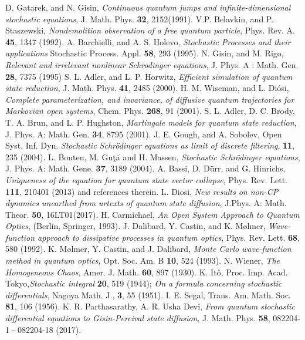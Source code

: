 \begin{thebibliography}{99}
	 D. Gatarek, and N. Gisin, {\em Continuous quantum jumps and infinite-dimensional stochastic equations}, J. Math. Phys. {\bf 32}, 2152(1991). 
	 V.P. Belavkin, and P. Staszewski, {\em Nondemolition observation of a free quantum particle}, Phys. Rev. A. {\bf 45}, 1347  (1992). 
	 A. Barchielli, and A. S. Holevo, {\em Stochastic Processes and their applications} Stochastic Process. Appl. {\bf 58}, 293 (1995).
	 N. Gisin, and M. Rigo, {\em Relevant and irrelevant nonlinear Schrodinger equations}, J. Phys. A : Math. Gen. {\bf 28}, 7375 (1995)
	 S. L. Adler, and L. P. Horwitz, {\em Efficient simulation of quantum state reduction}, J. Math. Phys. {\bf 41}, 2485 (2000).   
	 H. M. Wiseman, and  L. Di{\'o}si, {\em Complete parameterization, and invariance, of diffusive quantum trajectories for Markovian open systems}, Chem. Phys. {\bf 268}, 91 (2001). 
	 S. L. Adler, D. C. Brody, T. A. Brun, and L. P. Hughston, {\em Martingale models for quantum state reduction},  J. Phys. A: Math. Gen. {\bf 34}, 8795 (2001). 
	 J. E. Gough, and A. Sobolev, Open Syst. Inf. Dyn. {\em Stochastic Schrödinger equations as limit of discrete filtering}, {\bf 11}, 235 (2004).
	 L. Bouten, M. Gu{\c t}{\u a} and  H. Massen, {\em Stochastic Schrödinger equations}, J. Phys. A: Math. Gene. {\bf 37}, 3189 (2004). 
	 A. Bassi, D. D{\"u}rr, and  G. Hinrichs, {\em Uniqueness of the equation for quantum state vector collapse}, Phys. Rev. Lett. {\bf 111}, 210401 (2013) and references therein.  
	 L. Diosi, {\em New results on non-CP dynamics unearthed from urtexts of quantum state diffusion}, J.Phys. A: Math. Theor. {\bf 50}, 16LT01(2017). 
	 H. Carmichael, {\it An Open System Approach to Quantum Optics}, (Berlin, Springer, 1993). 
	 J. Dalibard, Y. Castin, and K. M{\o}lmer,  {\em Wave-function approach to dissipative processes in quantum optics}, Phys. Rev. Lett. {\bf 68}, 580 (1992). 
	 K. M{\o}lmer, Y. Castin, and J. Dalibard, {\em Monte Carlo wave-function method in quantum optics}, Opt. Soc. Am. B {\bf 10}, 524 (1993).   
	 N. Wiener, {\em The Homogeneous Chaos}, Amer. J. Math. {\bf 60}, 897 (1930).   
	 K. It\^{o}, Proc.  Imp. Acad. Tokyo,{\em Stochastic integral} {\bf 20}, 519 (1944); {\em On a formula concerning stochastic differentials}, Nagoya Math. J., {\bf 3}, 55 (1951).
	 I. E. Segal, Trans. Am. Math. Soc. {\bf 81}, 106 (1956). 
	 K. R. Parthasarathy, A. R.  Usha Devi, {\em From quantum stochastic differential equations to Gisin-Percival state diffusion}, J. Math. Phys. {\bf 58},  082204-1 - 082204-18   (2017).      

\end{thebibliography}
